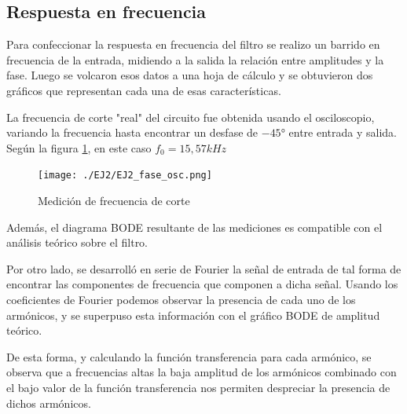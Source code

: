 \subsection{Respuesta en frecuencia}

Para confeccionar la respuesta en frecuencia del filtro se realizo un barrido en frecuencia de la entrada, midiendo a la salida la relaci\'on entre amplitudes y la fase. Luego se volcaron esos datos a una hoja de c\'alculo y se obtuvieron dos gr\'aficos que representan cada una de esas caracter\'isticas.




La frecuencia de corte "real" del circuito fue obtenida usando el osciloscopio, variando la frecuencia hasta encontrar un desfase de $-45°$ entre entrada y salida. Seg\'un la figura \ref{fig:phase_2}, en este caso $f_{0}=15,57kHz$


\begin{figure}[H]
    \centering
    \texttt{[image: ./EJ2/EJ2\_fase\_osc.png]}
    \caption{Medici\'on de frecuencia de corte}
    \label{fig:phase_2} 
\end{figure}
Adem\'as, el diagrama BODE resultante de las mediciones es compatible con el an\'alisis te\'orico sobre el filtro.

Por otro lado, se desarroll\'o en serie de Fourier la se\~nal de entrada de tal forma de encontrar las componentes de frecuencia que componen a dicha se\~nal. Usando los coeficientes de Fourier podemos observar la presencia de cada uno de los arm\'onicos, y se superpuso esta informaci\'on con el gr\'afico BODE de amplitud teórico.

De esta forma, y calculando la funci\'on transferencia para cada arm\'onico, se observa que a frecuencias altas la baja amplitud de los arm\'onicos combinado con el bajo valor de la funci\'on transferencia nos permiten despreciar la presencia de dichos arm\'onicos.

